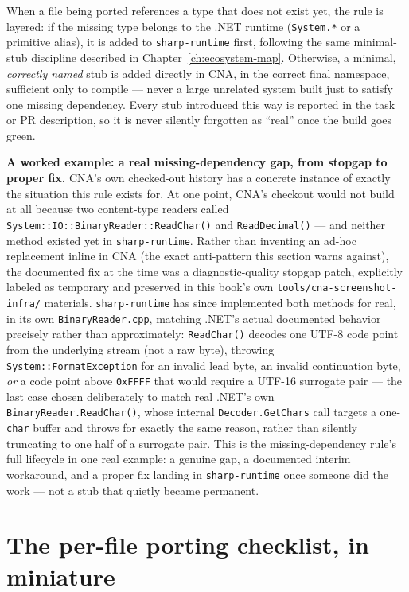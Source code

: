 When a file being ported references a type that does not exist yet, the rule is layered:
if the missing type belongs to the .NET runtime (\texttt{System.*} or a primitive alias), it
is added to \texttt{sharp-runtime} first, following the same minimal-stub discipline
described in Chapter~\ref{ch:ecosystem-map}. Otherwise, a minimal, \emph{correctly named}
stub is added directly in CNA, in the correct final namespace, sufficient only to compile ---
never a large unrelated system built just to satisfy one missing dependency. Every stub
introduced this way is reported in the task or PR description, so it is never silently
forgotten as ``real'' once the build goes green.

\begin{sourcenote}
\textbf{A worked example: a real missing-dependency gap, from stopgap to proper fix.} CNA's
own checked-out history has a concrete instance of exactly the situation this rule exists for.
At one point, CNA's checkout would not build at all because two content-type readers called
\texttt{System::IO::BinaryReader::ReadChar()} and \texttt{ReadDecimal()} --- and neither method
existed yet in \texttt{sharp-runtime}. Rather than inventing an ad-hoc replacement inline in
CNA (the exact anti-pattern this section warns against), the documented fix at the time was a
diagnostic-quality stopgap patch, explicitly labeled as temporary and preserved in this book's
own \texttt{tools/cna-screenshot-infra/} materials. \texttt{sharp-runtime} has since implemented
both methods for real, in its own \texttt{BinaryReader.cpp}, matching .NET's actual documented
behavior precisely rather than approximately: \texttt{ReadChar()} decodes one UTF-8 code point
from the underlying stream (not a raw byte), throwing \texttt{System::FormatException} for an
invalid lead byte, an invalid continuation byte, \emph{or} a code point above \texttt{0xFFFF}
that would require a UTF-16 surrogate pair --- the last case chosen deliberately to match real
.NET's own \texttt{BinaryReader.ReadChar()}, whose internal \texttt{Decoder.GetChars} call
targets a one-\texttt{char} buffer and throws for exactly the same reason, rather than silently
truncating to one half of a surrogate pair. This is the missing-dependency rule's full
lifecycle in one real example: a genuine gap, a documented interim workaround, and a proper
fix landing in \texttt{sharp-runtime} once someone did the work --- not a stub that quietly
became permanent.
\end{sourcenote}

\section{The per-file porting checklist, in miniature}

